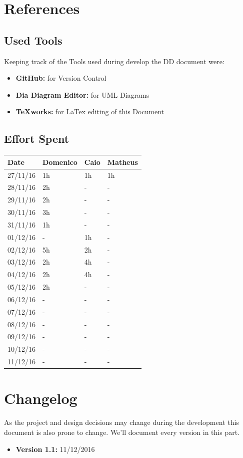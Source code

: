 \documentclass[a4paper]{article}
\begin{document}
\newpage

\section{References}
\subsection{Used Tools}
Keeping track of the Tools used during develop the DD document were:
\begin{itemize}
	\item \textbf{GitHub:} for Version Control
	\item \textbf {Dia Diagram Editor:} for UML Diagrams
	\item \textbf {TeXworks:} for LaTex editing of this Document
\end{itemize}
\newpage
\subsection{Effort Spent}
\begin{tabular}{ | l | l | l | l | }
\hline
	\textbf {Date} & \textbf {Domenico} & \textbf {Caio} & \textbf {Matheus} \\ \hline
	27/11/16& 1h & 1h & 1h  \\ \hline
	28/11/16& 2h & - & - \\ \hline
	29/11/16& 2h & - & - \\ \hline
	30/11/16& 3h & - & - \\ \hline
	31/11/16& 1h & - & - \\ \hline
	01/12/16& - & 1h & - \\ \hline
	02/12/16& 5h & 2h & - \\ \hline
	03/12/16& 2h & 4h & - \\ \hline
	04/12/16& 2h & 4h & - \\ \hline
	05/12/16& 2h & - & - \\ \hline
	06/12/16& - & - & - \\ \hline
	07/12/16& - & - & - \\ \hline
	08/12/16& - & - & - \\ \hline
	09/12/16& - & - & - \\ \hline
	10/12/16& - & - & - \\ \hline
	11/12/16& - & - & - \\ \hline
\end{tabular}
\newpage

\section{Changelog}
As the project and design decisions may change during the development this document is also prone to change.
We'll document every version in this part.
\begin{itemize}
\item \textbf {Version 1.1:} 11/12/2016
\end{itemize}
\end{document}
